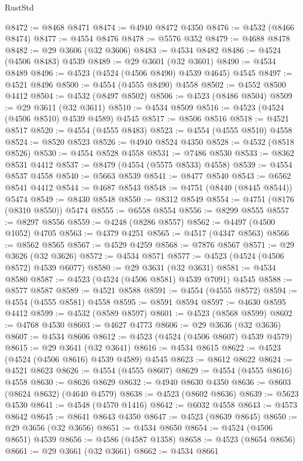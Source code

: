 \begin{lexlean}{RustStd}
\begin{coremodule}
@8472 := @8468 @8471
@8474 := @4940 @8472 @4350
@8476 := @4532 (@8466 @8474)
@8477 := @4554 @8476
@8478 := @5576 @352
@8479 := @4688 @8478
@8482 := @29 @3606 (@32 @3606)
@8483 := @4534 @8482
@8486 := @4524 (@4506 @8483) @4539
@8489 := @29 @3601 (@32 @3601)
@8490 := @4534 @8489
@8496 := @4523 (@4524 (@4506 @8490) @4539 @4645) @4545
@8497 := @4521 @8496
@8500 := @4554 (@4555 @8490) @4558
@8502 := @4552 @8500 @4412
@8504 := @4532 (@8497 @8502)
@8506 := @4523 (@8486 @8504)
@8509 := @29 @3611 (@32 @3611)
@8510 := @4534 @8509
@8516 := @4523 (@4524 (@4506 @8510) @4539 @4589) @4545
@8517 := @8506 @8516
@8518 := @4521 @8517
@8520 := @4554 (@4555 @8483)
@8523 := @4554 (@4555 @8510) @4558
@8524 := @8520 @8523
@8526 := @4940 @8524 @4350
@8528 := @4532 (@8518 @8526)
@8530 := @4554 @8528 @4558
@8531 := @7486 @8530
@8533 := @8362 @8531 @4412
@8537 := @8479 (@4554 (@5575 @8533) @4558)
@8539 := @4554 @8537 @4558
@8540 := @5663 @8539
@8541 := @8477 @8540
@8543 := @6562 @8541 @4412
@8544 := @4687 @8543
@8548 := @4751 (@8440 (@8445 @8544)) @5474
@8549 := @8430 @8548
@8550 := @8312 @8549
@8554 := @4751 (@8176 (@8310 @8550)) @5474
@8555 := @6558 @8554
@8556 := @8299 @8555
@8557 := @8297 @8556
@8559 := @4248 (@8286 @8557)
@8562 := @4497 (@4500 @1052) @4705
@8563 := @4379 @4251
@8565 := @4517 (@4347 @8563)
@8566 := @8562 @8565
@8567 := @4529 @4259
@8568 := @7876 @8567
@8571 := @29 @3626 (@32 @3626)
@8572 := @4534 @8571
@8577 := @4523 (@4524 (@4506 @8572) @4539 @6077)
@8580 := @29 @3631 (@32 @3631)
@8581 := @4534 @8580
@8587 := @4523 (@4524 (@4506 @8581) @4539 @7091) @4545
@8588 := @8577 @8587
@8589 := @4521 @8588
@8591 := @4554 (@4555 @8572)
@8594 := @4554 (@4555 @8581) @4558
@8595 := @8591 @8594
@8597 := @4630 @8595 @4412
@8599 := @4532 (@8589 @8597)
@8601 := @4523 (@8568 @8599)
@8602 := @4768 @4530
@8603 := @4627 @4773
@8606 := @29 @3636 (@32 @3636)
@8607 := @4534 @8606
@8612 := @4523 (@4524 (@4506 @8607) @4539 @4579)
@8615 := @29 @3641 (@32 @3641)
@8616 := @4534 @8615
@8622 := @4523 (@4524 (@4506 @8616) @4539 @4589) @4545
@8623 := @8612 @8622
@8624 := @4521 @8623
@8626 := @4554 (@4555 @8607)
@8629 := @4554 (@4555 @8616) @4558
@8630 := @8626 @8629
@8632 := @4940 @8630 @4350
@8636 := @8603 (@8624 @8632) (@4640 @4579)
@8638 := @4523 (@8602 @8636)
@8639 := @5623 @4530
@8641 := @4548 (@4570 @1416)
@8642 := @6032 @4558
@8643 := @4573 @8642
@8645 := @8641 @8643 @4350
@8647 := @4523 (@8639 @8645)
@8650 := @29 @3656 (@32 @3656)
@8651 := @4534 @8650
@8654 := @4524 (@4506 @8651) @4539
@8656 := @4586 (@4587 @1358)
@8658 := @4523 (@8654 @8656)
@8661 := @29 @3661 (@32 @3661)
@8662 := @4534 @8661

\end{coremodule}
\end{lexlean}
